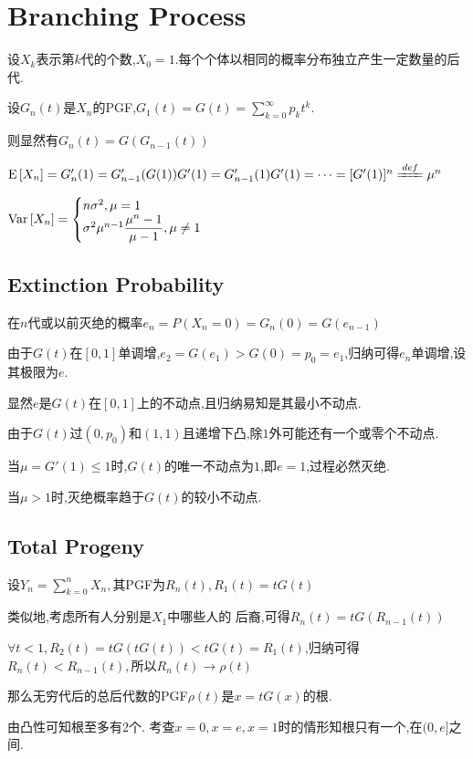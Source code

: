 \section{Branching Process}
设$ X_k$表示第$ k$代的个数,$ X_0=1.$每个个体以相同的概率分布独立产生一定数量的后代.

设$ G_n(t)$是$ X_n$的PGF,$ G_1(t) = G(t) = \sum_{k=0}^\infty{p_k}t^k$.

则显然有$ G_n(t) = G(G_{n-1}(t))$

$ \E{X_n} = G'_n(1) = G'_{n-1}(G(1))G'(1) = G'_{n-1}(1)G'(1) = \cdots =[G'(1)]^n \xlongequal{def}\mu^n$

$ \text{Var}\left[X_n\right] = \begin{cases} n\sigma^2 , \mu=1 \\ \sigma^2\mu^{n-1}\dfrac{\mu^n-1}{\mu-1}, \mu\neq 1\end{cases}$

\subsection{Extinction Probability}
在$ n$代或以前灭绝的概率$ e_n = P(X_n = 0) = G_n(0) = G(e_{n-1})$

由于$ G(t)$在$ [0,1]$单调增,$ e_2 = G(e_1) > G(0) = p_0 = e_1$,归纳可得$ e_n$单调增,设其极限为$ e$.

显然$ e$是$ G(t)$在$ [0,1]$上的不动点,且归纳易知是其最小不动点.

由于$ G(t)$过$ (0,p_0)$和$ (1,1)$且递增下凸,除$ 1$外可能还有一个或零个不动点.

当$ \mu = G'(1) \le 1$时,$ G(t)$的唯一不动点为$ 1$,即$ e = 1$,过程必然灭绝.

当$ \mu >1$时,灭绝概率趋于$ G(t)$的较小不动点.

\subsection{Total Progeny}
设$ Y_n = \sum_{k=0}^n{X_n},$其PGF为$ R_n(t), R_1(t) = tG(t)$

类似地,考虑所有人分别是$ X_1$中哪些人的 后裔,可得$ R_n(t) = tG(R_{n-1}(t))$

$ \forall t < 1, R_2(t) = tG(tG(t)) < tG(t) = R_1(t)$,归纳可得$ R_n(t)< R_{n-1}(t),$所以$ R_n(t)\to \rho(t)$

那么无穷代后的总后代数的PGF$ \rho(t)$是$ x = tG(x) $的根.

由凸性可知根至多有2个. 考查$ x=0, x=e, x=1$时的情形知根只有一个,在$ (0,e]$之间.

